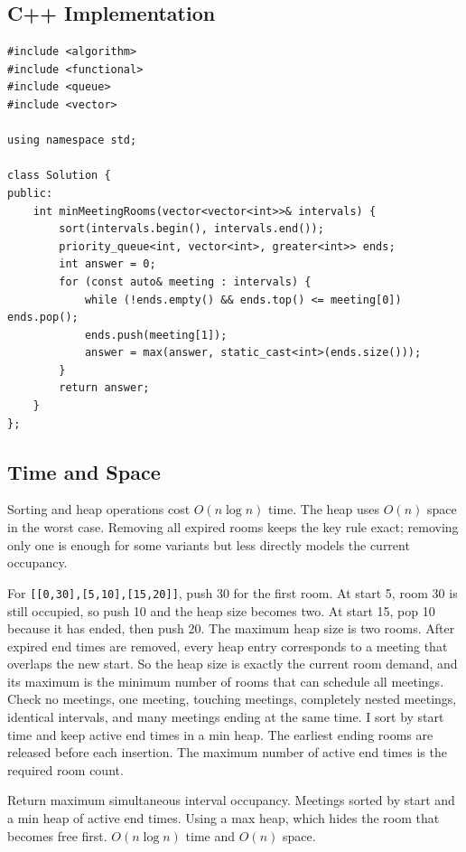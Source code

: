 \subsection{C++ Implementation}
\begin{lstlisting}[style=compactcode,caption={Complete C++ solution: Meeting Rooms II}]
#include <algorithm>
#include <functional>
#include <queue>
#include <vector>

using namespace std;

class Solution {
public:
    int minMeetingRooms(vector<vector<int>>& intervals) {
        sort(intervals.begin(), intervals.end());
        priority_queue<int, vector<int>, greater<int>> ends;
        int answer = 0;
        for (const auto& meeting : intervals) {
            while (!ends.empty() && ends.top() <= meeting[0]) ends.pop();
            ends.push(meeting[1]);
            answer = max(answer, static_cast<int>(ends.size()));
        }
        return answer;
    }
};
\end{lstlisting}

\subsection{Time and Space}
Sorting and heap operations cost \(O(n\log n)\) time. The heap uses \(O(n)\)
space in the worst case. Removing all expired rooms keeps the key rule exact;
removing only one is enough for some variants but less directly models
the current occupancy.

\lessonexpansion
  {For \texttt{[[0,30],[5,10],[15,20]]}, push 30 for the first room. At start
   5, room 30 is still occupied, so push 10 and the heap size becomes two. At
   start 15, pop 10 because it has ended, then push 20. The maximum heap size
   is two rooms.}
  {After expired end times are removed, every heap entry corresponds to a
   meeting that overlaps the new start. So the heap size is exactly
   the current room demand, and its maximum is the minimum number of rooms
   that can schedule all meetings.}
  {Check no meetings, one meeting, touching meetings, completely nested
   meetings, identical intervals, and many meetings ending at the same time.}
  {I sort by start time and keep active end times in a min heap. The earliest
   ending rooms are released before each insertion. The maximum number of
   active end times is the required room count.}

\chaptercheckpoint
  {Return maximum simultaneous interval occupancy.}
  {Meetings sorted by start and a min heap of active end times.}
  {Using a max heap, which hides the room that becomes free first.}
  {$O(n\log n)$ time and $O(n)$ space.}
